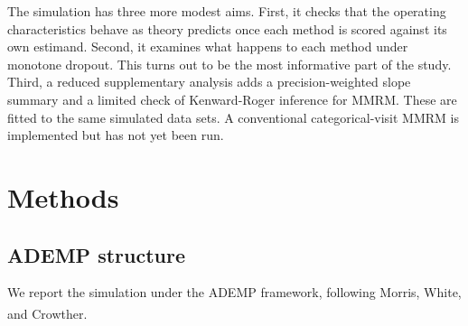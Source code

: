 \documentclass[
  11pt,
]{article}
\begin{document}
The simulation has three more modest aims. First, it checks
that the operating characteristics behave as theory predicts
once each method is scored against its own estimand. Second,
it examines what happens to each method under monotone
dropout. This turns out to be the most informative part of the
study. Third, a reduced supplementary analysis adds a
precision-weighted slope summary and a limited check of
Kenward-Roger inference for MMRM. These are fitted to the same
simulated data sets. A conventional categorical-visit MMRM is
implemented but has not yet been run.

\section{Methods}\label{methods}

\subsection{ADEMP structure}\label{ademp-structure}

We report the simulation under the ADEMP framework, following
Morris, White, and Crowther\textsuperscript{}.
\end{document}
